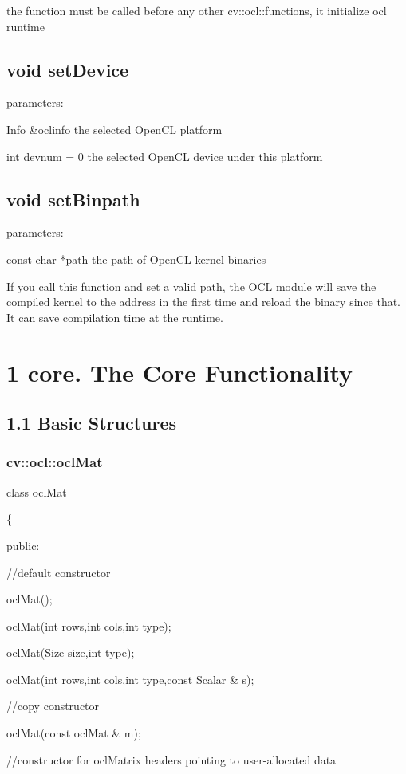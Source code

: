 \documentclass{article}
\begin{document}
the function must be called before any other cv::ocl::functions, it initialize ocl runtime

\subsection{void setDevice}


parameters:

Info \&oclinfo  the selected OpenCL platform

int devnum = 0 the selected OpenCL device under this platform

\subsection{void setBinpath}


parameters:

const char *path the path of OpenCL kernel binaries

If you call this function and set a valid path, the OCL module will save the compiled kernel to the address in the first time and reload the binary since that. It can save compilation time at the runtime.


\section{1 core. The Core Functionality}
\label{sec:mylabel1}
\subsection{1.1 Basic Structures}
\label{subsec:mylabel1}
\subsubsection{cv::ocl::oclMat}
\label{subsec:mylabel1}

class oclMat

\{

  public:

    //default constructor

    oclMat();

    oclMat(int rows,int cols,int type);

    oclMat(Size size,int type);

    oclMat(int rows,int cols,int type,const Scalar \& s);

    //copy constructor

    oclMat(const oclMat \& m);

    //constructor for oclMatrix headers pointing to user-allocated data
\end{document}
